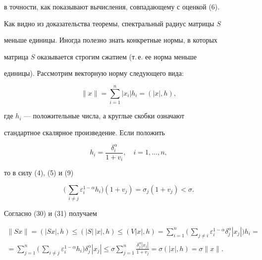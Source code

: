 в точности, как показывают вычисления, совпадающему с оценкой (6). 


 


Как видно из доказательства теоремы, спектральный радиус матрицы $S$ 


меньше единицы. Иногда полезно знать конкретные нормы, в которых  


матрица $S$ оказывается строгим сжатием (т.\,е. ее норма меньше 


единицы). Рассмотрим векторную норму следующего вида: 


\begin{equation} 


\|x\|=\sum^n_{i=1}|x_i|h_i=(|x|,h), 


\end{equation} 


где $h_i$ --- положительные числа, а круглые скобки означают 


стандартное скалярное произведение. Если положить 


\begin{equation} 


h_i=\frac{\delta^\alpha_i}{1+v_i},\quad i=1,\dotsc,n, 


\end{equation} 


то в силу (4), (5) и (9) 


$$ 


\bigg(\,\sum_{i\ne j}\varepsilon^{1-\alpha}_i h_i\bigg) 


(1+v_j)=\sigma_j(1+v_j)<\sigma. 


$$ 


Согласно (30) и (31) получаем 


\begin{multline*} 


\|S x\|=(|S x|,h)\le(|S|\,|x|,h)\le(V|x|,h)=


\sum^n_{i=1}\bigg(\,\sum_{j\ne i} 


\varepsilon^{1-\alpha}_i\delta^\alpha_j|x_j|\bigg)h_i= \\


%


=\sum^n_{j=1}\bigg(\,\sum_{i\ne j}\varepsilon^{1-\alpha}_i 


h_i\bigg)\delta^\alpha_j|x_j|\le


\sigma\sum^n_{j=1}\frac{\delta^\alpha_j|x_j|}{1+v_j} 


=\sigma(|x|,h)=\sigma\|x\|. 


\end{multline*} 


